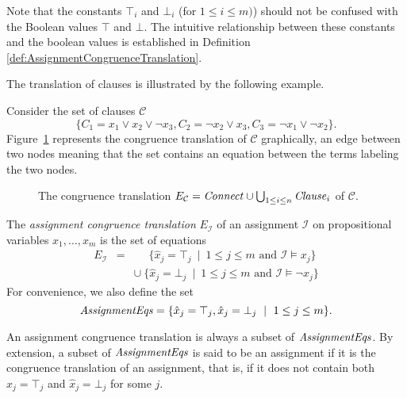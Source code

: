 \documentclass[smallextended]{svjour3}
\newcommand{\Assignment}{{\it AssignmentEqs}}
\newcommand{\Clause}{{\it Clause}}
\newcommand{\Connect}{{\it Connect}}
\begin{document}
\begin{remark}
Note that the constants $\top_i$ and $\bot_i$ (for $1 \leq i \leq m)$) should not be confused with the Boolean values $\top$ and $\bot$. The intuitive relationship between these constants and the boolean values is established in Definition \ref{def:AssignmentCongruenceTranslation}.
\end{remark}


\noindent The translation of clauses is illustrated by the following example.

\begin{example}\label{ex:np1}
Consider the set of clauses $\mathcal{C}$
\begin{equation*}
\big\{C_1 = x_1 \vee x_2 \vee \neg x_3, C_2 = \neg x_2 \vee x_3, C_3 = \neg x_1 \vee \neg x_2\big\}.
\end{equation*}
Figure~\ref{fig:npexamplebig} represents the congruence translation of
$\mathcal{C}$ graphically, an edge between two nodes meaning that the set
contains an equation between the terms labeling the two nodes.

\begin{figure}[htb]

\caption{The congruence translation $E_{\mathcal{C}} = \Connect \cup \bigcup_{1 \leq i \leq n}\Clause_i$ of $\mathcal{C}$.}
\label{fig:npexamplebig}
\end{figure}

\end{example}

\begin{definition}
\label{def:AssignmentCongruenceTranslation}
  The \emph{assignment congruence translation} $E_{\mathcal{I}}$ of an assignment $\mathcal{I}$ on propositional variables $x_1,\ldots,x_m$ is the set of equations
\begin{eqnarray*}
  E_{\mathcal{I}} & = & \phantom{\cup}\ \{ \hat{x}_j = \top_j \ \mid\  1 \leq j \leq m \text{ and } \mathcal{I} \models x_j \} \\
               &   & \cup\ \{ \hat{x}_j = \bot_j \ \mid\ 1 \leq j \leq m \text{ and } \mathcal{I} \models \neg x_j \}
\end{eqnarray*}
For convenience, we also define the set
\begin{equation*}
  \Assignment = \{ \hat{x}_j = \top_j, \hat{x}_j = \bot_j \ \mid\ 1 \leq j \leq m\}.
\end{equation*}
\end{definition}
\noindent
An assignment congruence translation is always a subset of
$\Assignment$.  By extension, a subset of $\Assignment$ is
said to be an assignment if it is the congruence translation of an assignment,
that is, if it does not contain both $\hat{x}_j = \top_j$ and $\hat{x}_j =
\bot_j$ for some $j$.
\end{document}

